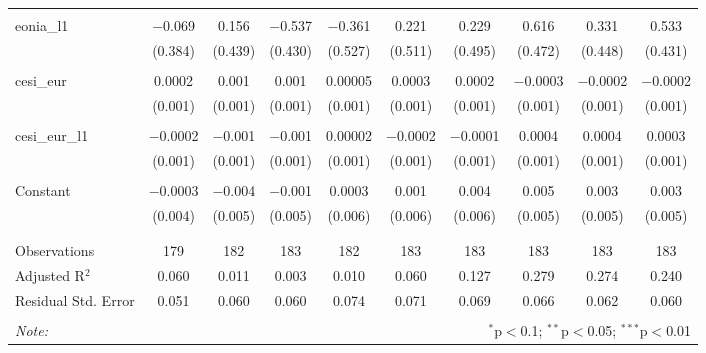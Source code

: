 \begin{table}[!htbp]
\begin{adjustbox}{width=1.35\textwidth}
\begin{tabular}{@{\extracolsep{5pt}}lccccccccc}
  & & & & & & & & & \\ 
 eonia\_l1 & $-$0.069 & 0.156 & $-$0.537 & $-$0.361 & 0.221 & 0.229 & 0.616 & 0.331 & 0.533 \\ 
  & (0.384) & (0.439) & (0.430) & (0.527) & (0.511) & (0.495) & (0.472) & (0.448) & (0.431) \\ 
  & & & & & & & & & \\ 
 cesi\_eur & 0.0002 & 0.001 & 0.001 & 0.00005 & 0.0003 & 0.0002 & $-$0.0003 & $-$0.0002 & $-$0.0002 \\ 
  & (0.001) & (0.001) & (0.001) & (0.001) & (0.001) & (0.001) & (0.001) & (0.001) & (0.001) \\ 
  & & & & & & & & & \\ 
 cesi\_eur\_l1 & $-$0.0002 & $-$0.001 & $-$0.001 & 0.00002 & $-$0.0002 & $-$0.0001 & 0.0004 & 0.0004 & 0.0003 \\ 
  & (0.001) & (0.001) & (0.001) & (0.001) & (0.001) & (0.001) & (0.001) & (0.001) & (0.001) \\ 
  & & & & & & & & & \\ 
 Constant & $-$0.0003 & $-$0.004 & $-$0.001 & 0.0003 & 0.001 & 0.004 & 0.005 & 0.003 & 0.003 \\ 
  & (0.004) & (0.005) & (0.005) & (0.006) & (0.006) & (0.006) & (0.005) & (0.005) & (0.005) \\ 
  & & & & & & & & & \\ 
\hline \\[-1.8ex] 
Observations & 179 & 182 & 183 & 182 & 183 & 183 & 183 & 183 & 183 \\ 
Adjusted R$^{2}$ & 0.060 & 0.011 & 0.003 & 0.010 & 0.060 & 0.127 & 0.279 & 0.274 & 0.240 \\ 
Residual Std. Error & 0.051 & 0.060 & 0.060 & 0.074 & 0.071 & 0.069 & 0.066 & 0.062 & 0.060 \\ 
\hline 
\hline \\[-1.8ex] 
\textit{Note:}  & \multicolumn{9}{r}{$^{*}$p$<$0.1; $^{**}$p$<$0.05; $^{***}$p$<$0.01} \\ 
\end{tabular} 
\end{adjustbox}
\end{table} 